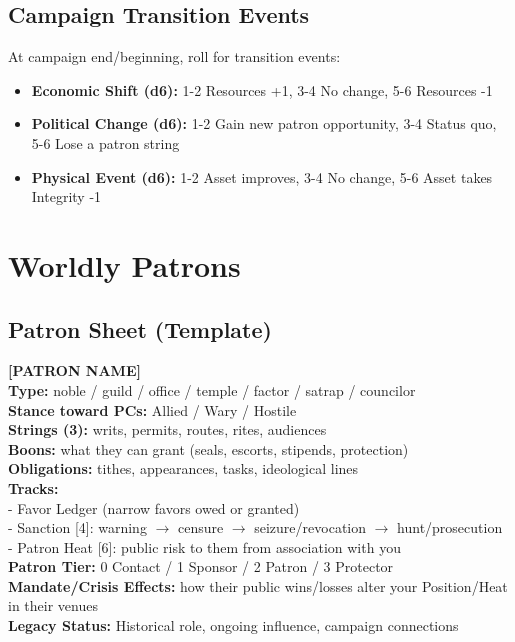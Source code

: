\documentclass[10pt]{article}
\begin{document}
    \subsection{Campaign Transition Events}
    At campaign end/beginning, roll for transition events:
    \begin{itemize}
      \item \textbf{Economic Shift (d6):} 1-2 Resources +1, 3-4 No change, 5-6 Resources -1
      \item \textbf{Political Change (d6):} 1-2 Gain new patron opportunity, 3-4 Status quo, 5-6 Lose a patron string
      \item \textbf{Physical Event (d6):} 1-2 Asset improves, 3-4 No change, 5-6 Asset takes Integrity -1
    \end{itemize}
    
    \section{Worldly Patrons}
    \subsection{Patron Sheet (Template)}
    \begin{framed}
    \noindent\textbf{[PATRON NAME]}\\
    \textbf{Type:} noble / guild / office / temple / factor / satrap / councilor\\
    \textbf{Stance toward PCs:} Allied / Wary / Hostile\\
    \textbf{Strings (3):} writs, permits, routes, rites, audiences\\
    \textbf{Boons:} what they can grant (seals, escorts, stipends, protection)\\
    \textbf{Obligations:} tithes, appearances, tasks, ideological lines\\
    \textbf{Tracks:}\\
    \hspace{10pt}- Favor Ledger (narrow favors owed or granted)\\
    \hspace{10pt}- Sanction [4]: warning $\rightarrow$ censure $\rightarrow$ seizure/revocation $\rightarrow$ hunt/prosecution\\
    \hspace{10pt}- Patron Heat [6]: public risk to them from association with you\\
    \textbf{Patron Tier:} 0 Contact / 1 Sponsor / 2 Patron / 3 Protector\\
    \textbf{Mandate/Crisis Effects:} how their public wins/losses alter your Position/Heat in their venues\\
    \textbf{Legacy Status:} Historical role, ongoing influence, campaign connections
    \end{framed}
    
\end{document}

